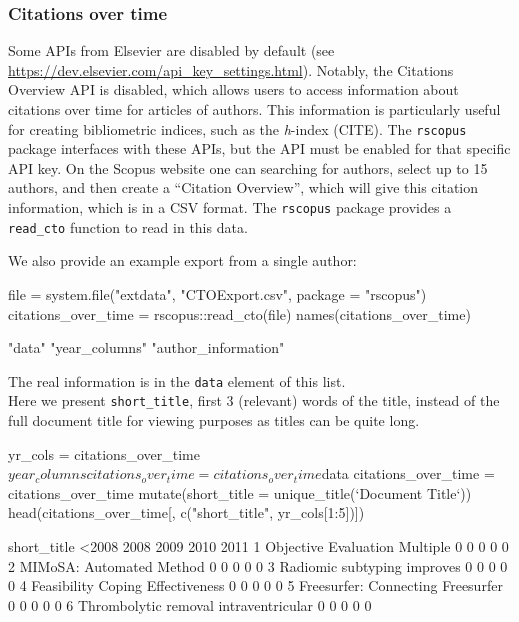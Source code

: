 \hypertarget{citations-over-time}{%
\subsubsection{Citations over time}\label{citations-over-time}}

Some APIs from Elsevier are disabled by default (see
\url{https://dev.elsevier.com/api_key_settings.html}). Notably, the
Citations Overview API is disabled, which allows users to access
information about citations over time for articles of authors. This
information is particularly useful for creating bibliometric indices,
such as the \emph{h}-index (CITE). The \texttt{rscopus} package
interfaces with these APIs, but the API must be enabled for that
specific API key. On the Scopus website one can searching for authors,
select up to 15 authors, and then create a ``Citation Overview'', which
will give this citation information, which is in a CSV format. The
\texttt{rscopus} package provides a \texttt{read\_cto} function to read
in this data.

We also provide an example export from a single author:

\begin{Schunk}
\begin{Sinput}
file = system.file("extdata", "CTOExport.csv", package = "rscopus")
citations_over_time = rscopus::read_cto(file)
names(citations_over_time)
\end{Sinput}
\begin{Soutput}
[1] "data"               "year_columns"       "author_information"
\end{Soutput}
\end{Schunk}

The real information is in the \texttt{data} element of this list.\\
Here we present \texttt{short\_title}, first 3 (relevant) words of the
title, instead of the full document title for viewing purposes as titles
can be quite long.

\begin{Schunk}
\begin{Sinput}
yr_cols = citations_over_time$year_columns
citations_over_time = citations_over_time$data
citations_over_time = citations_over_time %>% 
  mutate(short_title = unique_title(`Document Title`))
head(citations_over_time[, c("short_title", yr_cols[1:5])])
\end{Sinput}
\begin{Soutput}
                            short_title <2008 2008 2009 2010 2011
1         Objective Evaluation Multiple     0    0    0    0    0
2              MIMoSA: Automated Method     0    0    0    0    0
3           Radiomic subtyping improves     0    0    0    0    0
4      Feasibility Coping Effectiveness     0    0    0    0    0
5     Freesurfer: Connecting Freesurfer     0    0    0    0    0
6 Thrombolytic removal intraventricular     0    0    0    0    0
\end{Soutput}
\end{Schunk}

